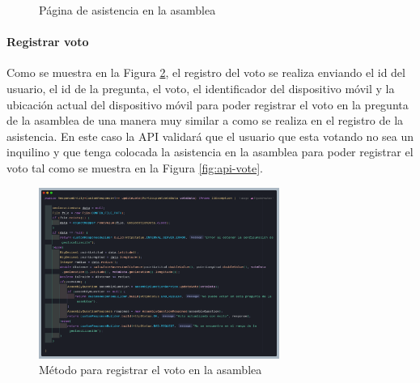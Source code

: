 \begin{figure}[H]
    \centering
    \caption{Página de asistencia en la asamblea}
    \label{fig:app-asistencia}
\end{figure}

\paragraph{Registrar voto}

Como se muestra en la Figura \ref{fig:api-votacion-codigo}, el registro del voto se realiza enviando el id del usuario, el id de la pregunta, el voto, el identificador del dispositivo móvil y la ubicación actual del dispositivo móvil para poder registrar el voto en la pregunta de la asamblea de una manera muy similar a como se realiza en el registro de la asistencia.
En este caso la API validará que el usuario que esta votando no sea un inquilino y que tenga colocada la asistencia en la asamblea para poder registrar el voto tal como se muestra en la Figura \ref{fig:api-vote}.

\begin{figure}[H]
    \centering
    \includegraphics[width=0.7\textwidth]{resources/images/api-votacion-metodo}
    \caption{Método para registrar el voto en la asamblea}
    \label{fig:api-votacion-codigo}
\end{figure}

